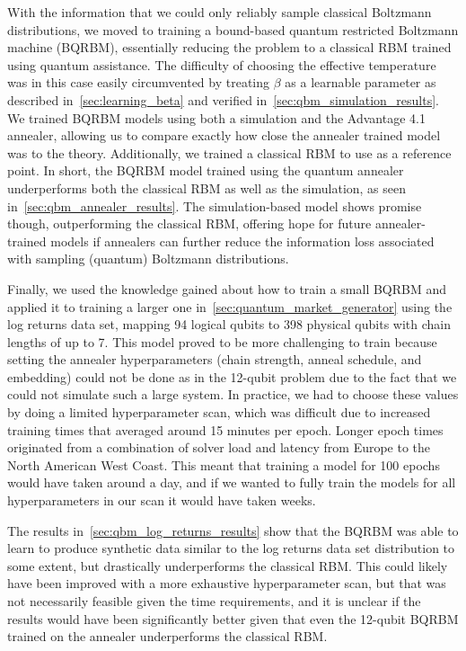 With the information that we could only reliably sample classical Boltzmann distributions, we moved to training a bound-based quantum restricted Boltzmann machine (BQRBM), essentially reducing the problem to a classical RBM trained using quantum assistance.
The difficulty of choosing the effective temperature was in this case easily circumvented by treating \( \beta \) as a learnable parameter as described in~\cref{sec:learning_beta} and verified in~\cref{sec:qbm_simulation_results}.
We trained BQRBM models using both a simulation and the Advantage 4.1 annealer, allowing us to compare exactly how close the annealer trained model was to the theory.
Additionally, we trained a classical RBM to use as a reference point.
In short, the BQRBM model trained using the quantum annealer underperforms both the classical RBM as well as the simulation, as seen in~\cref{sec:qbm_annealer_results}.
The simulation-based model shows promise though, outperforming the classical RBM, offering hope for future annealer-trained models if annealers can further reduce the information loss associated with sampling (quantum) Boltzmann distributions.

Finally, we used the knowledge gained about how to train a small BQRBM and applied it to training a larger one in~\cref{sec:quantum_market_generator} using the log returns data set, mapping 94 logical qubits to 398 physical qubits with chain lengths of up to 7.
This model proved to be more challenging to train because setting the annealer hyperparameters (chain strength, anneal schedule, and embedding) could not be done as in the 12-qubit problem due to the fact that we could not simulate such a large system.
In practice, we had to choose these values by doing a limited hyperparameter scan, which was difficult due to increased training times that averaged around 15 minutes per epoch.
Longer epoch times originated from a combination of solver load and latency from Europe to the North American West Coast.
This meant that training a model for 100 epochs would have taken around a day, and if we wanted to fully train the models for all hyperparameters in our scan it would have taken weeks.

The results in~\cref{sec:qbm_log_returns_results} show that the BQRBM was able to learn to produce synthetic data similar to the log returns data set distribution to some extent, but drastically underperforms the classical RBM.
This could likely have been improved with a more exhaustive hyperparameter scan, but that was not necessarily feasible given the time requirements, and it is unclear if the results would have been significantly better given that even the 12-qubit BQRBM trained on the annealer underperforms the classical RBM.

